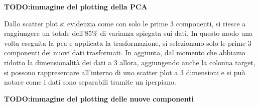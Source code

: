 \textbf{TODO:immagine del plotting della PCA}

Dallo scatter plot si evidenzia come con solo le prime 3 componenti, si riesce
a raggiungere un totale dell'$85\%$ di varianza spiegata sui dati. In questo modo
una volta eseguita la pca e applicata la trasformazione, si selezionano solo le
prime 3 componenti dei nuovi dati trasformati. 
In aggiunta, dal momento che abbiamo ridotto la dimensionalità dei dati a $3$ 
allora, aggiungendo anche la colonna target, si possono rappresentare all'interno
di uno scatter plot a $3$ dimensioni e si può notare come i dati sono separabili
tramite un iperpiano.

\textbf{TODO:immagine del plotting delle nuove componenti}
